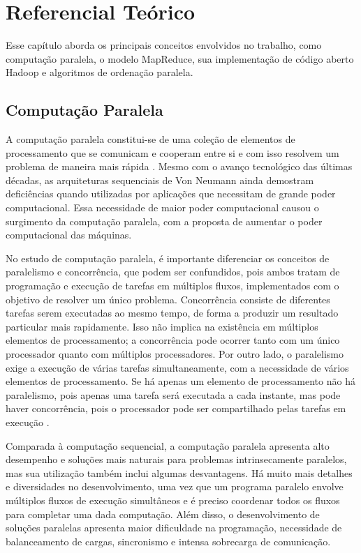 \chapter{Referencial Teórico}
\label{cap:referencial}

Esse capítulo aborda os principais conceitos envolvidos no trabalho,  como computação paralela, o modelo MapReduce, sua implementação de código aberto Hadoop e algoritmos de ordenação paralela.

\section{Computação Paralela}

A computação paralela constitui-se de uma coleção de elementos de processamento que se comunicam e cooperam entre si e com isso resolvem um problema de maneira mais rápida \cite{Almasi:1994}. Mesmo com o avanço tecnológico das últimas décadas, as arquiteturas sequenciais de Von Neumann ainda demostram deficiências quando utilizadas por aplicações que necessitam de grande poder computacional. Essa necessidade de maior poder computacional causou o surgimento da computação paralela, com a proposta de aumentar o poder computacional das máquinas.

No estudo de computação paralela, é importante diferenciar os conceitos de paralelismo e concorrência, que podem ser confundidos, pois ambos tratam de programação e execução de tarefas em múltiplos fluxos, implementados com o objetivo de resolver um único problema. Concorrência consiste de diferentes tarefas serem executadas ao mesmo tempo, de forma a produzir um resultado particular mais rapidamente. Isso não implica na existência em múltiplos elementos de processamento; a concorrência pode ocorrer tanto com um único processador quanto com múltiplos processadores. 
Por outro lado, o paralelismo exige a execução de várias tarefas simultaneamente, com a necessidade de vários elementos de processamento. 
Se há apenas um elemento de processamento não há paralelismo, pois apenas uma tarefa será executada a cada instante, mas pode haver concorrência, pois o processador pode ser compartilhado pelas tarefas em execução \cite{Breshears:2009}.

Comparada à computação sequencial, a computação paralela apresenta alto desempenho e soluções mais naturais para problemas intrinsecamente paralelos, mas sua utilização também inclui algumas desvantagens. Há muito mais detalhes e diversidades no desenvolvimento, uma vez que um programa paralelo envolve múltiplos fluxos de execução simultâneos e é preciso coordenar todos os fluxos para completar uma dada computação. Além disso, o desenvolvimento de soluções paralelas apresenta maior dificuldade na programação, necessidade de balanceamento de cargas, sincronismo e intensa sobrecarga de comunicação. 

